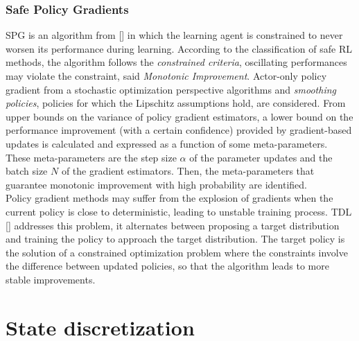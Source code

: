 \subsubsection{Safe Policy Gradients} \label{subsec:safepg}
\acf{SPG} is an algorithm from [\cite{papini2019}] in which the learning agent is constrained to never worsen its performance during learning. According to the classification of safe \ac{RL} methods, the algorithm follows the \emph{constrained criteria}, oscillating performances may violate the constraint, said \emph{Monotonic Improvement}. Actor-only policy gradient from a stochastic optimization perspective algorithms and \emph{smoothing policies}, \ie policies for which the Lipschitz assumptions hold, are considered. From upper bounds on the variance of policy gradient estimators, a lower bound on the performance improvement (with a certain confidence) provided by gradient-based updates is calculated and expressed as a function of some meta-parameters. These meta-parameters are the step size $\alpha$ of the parameter updates and the batch size $N$ of the gradient estimators. Then, the meta-parameters that guarantee monotonic improvement with high probability are identified.\\
\newline 
Policy gradient methods may suffer from the explosion of gradients when the current policy is close to deterministic, leading to unstable training process. \acf{TDL} [\cite{DBLP:journals/corr/abs-1905-11041}] addresses this problem, it alternates between proposing a target distribution and training the policy to approach the target distribution. The target policy is the solution of a constrained optimization problem where the constraints involve the difference between updated policies, so that the algorithm leads to more stable improvements.

\section{State discretization} \label{sec:stdisc}